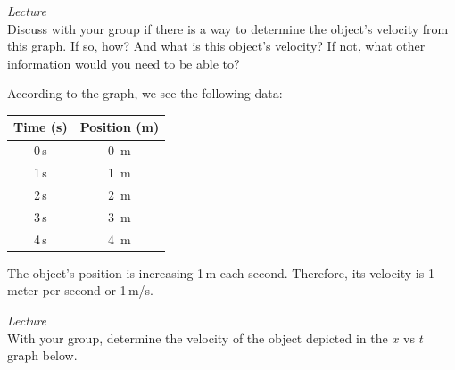 \documentclass[dvipsnames]{exam}
\begin{document}
\begin{questions}
\question
\textit{Lecture}\\
Discuss with your group if there is a way to determine the object's velocity from this graph. If so, how? And what is this object’s velocity? If not, what other information would you need to be able to?

\begin{center}
\end{center}

\begin{solution}
    According to the graph, we see the following data:

    \begin{center}
        \begin{tabular}{|c|c|}
            \hline
             \textbf{Time (s)} & \textbf{Position (m)} \\ \hline
             0\,s & \SI{0}{m} \\ \hline
             1\,s & \SI{1}{m} \\ \hline
             2\,s & \SI{2}{m} \\ \hline
             3\,s & \SI{3}{m} \\  \hline
             4\,s & \SI{4}{m} \\ \hline
        \end{tabular}
    \end{center}

    The object's position is increasing 1\,m each second. Therefore, its velocity is 1 meter per second or 1\,m/s.
\end{solution}

\question
\textit{Lecture}\\
With your group, determine the velocity of the object depicted in the $x$ vs $t$ graph below.

\begin{center}
\end{center}


\end{questions}
\end{document}
